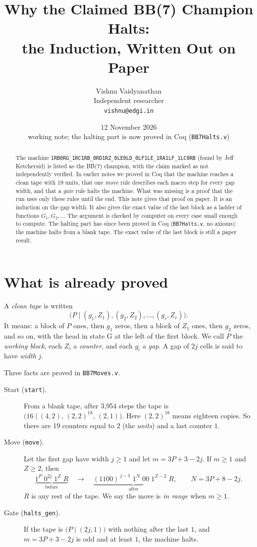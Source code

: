 \documentclass[11pt]{article}
\title{Why the Claimed BB(7) Champion Halts:\\ the Induction, Written Out on Paper}
\author{Vishnu Vaidyanathan\\ \small Independent researcher\\ \small \texttt{vishnu@edgi.in}}
\date{12 November 2026 \\ \small working note; the halting part is now proved in Coq (\texttt{BB7Halts.v})}
\theoremstyle{definition}
\theoremstyle{remark}
\newcommand{\st}[2]{\bigl(#1 \mid #2\bigr)}
\begin{document}
\maketitle

\begin{abstract}\sloppy
The machine \texttt{1RB0RG\_\allowbreak 1RC1RB\_\allowbreak 0RD1RZ\_\allowbreak 0LE0LD\_\allowbreak 0LF1LE\_\allowbreak 1RA1LF\_\allowbreak 1LC0RB}
(found by Jeff Ketchersid) is listed as the BB(7) champion, with the claim marked
as not independently verified. In earlier notes we proved in Coq that the machine
reaches a clean tape with 19 units, that one \emph{move} rule describes each
macro step for every gap width, and that a \emph{gate} rule halts the machine.
What was missing is a proof that the run uses only these rules until the end.
This note gives that proof on paper. It is an induction on the gap width. It also
gives the exact value of the last block as a ladder of functions $G_1,G_2,\dots$
The argument is checked by computer on every case small enough to compute.
The halting part has since been proved in Coq (\texttt{BB7Halts.v}, no axioms):
the machine halts from a blank tape. The exact value of the last block is still
a paper result.
\end{abstract}

\section{What is already proved}

A \emph{clean tape} is written
\[
\st{P}{(g_1,Z_1),(g_2,Z_2),\dots,(g_r,Z_r)} .
\]
It means: a block of $P$ ones, then $g_1$ zeros, then a block of $Z_1$ ones, then
$g_2$ zeros, and so on, with the head in state G at the left of the first block.
We call $P$ the \emph{working block}, each $Z_i$ a \emph{counter}, and each $g_i$
a \emph{gap}. A gap of $2j$ cells is said to have \emph{width} $j$.

Three facts are proved in \texttt{BB7Moves.v}.

\begin{description}
\item[Start (\texttt{start}).] From a blank tape, after 3{,}954 steps the tape is
$\st{16}{(4,2),\,(2,2)^{18},\,(2,1)}$. Here $(2,2)^{18}$ means eighteen copies.
So there are 19 counters equal to $2$ (the \emph{units}) and a last counter $1$.

\item[Move (\texttt{move}).] Let the first gap have width $j\ge 1$ and let
$m=3P+3-2j$. If $m\ge 1$ and $Z\ge 2$, then
\[
\underbrace{1^{P}\;0^{2j}\;1^{Z}\;R}_{\text{before}}
\quad\longrightarrow\quad
\underbrace{(1100)^{\,j-1}\;1^{N}\;00\;1^{Z-2}\;R}_{\text{after}},
\qquad N=3P+8-2j .
\]
$R$ is any rest of the tape. We say the move is \emph{in range} when $m\ge 1$.

\item[Gate (\texttt{halts\_gen}).] If the tape is $\st{P}{(2j,1)}$ with nothing
after the last $1$, and $m=3P+3-2j$ is odd and at least $1$, the machine halts.
\end{description}
\end{document}
